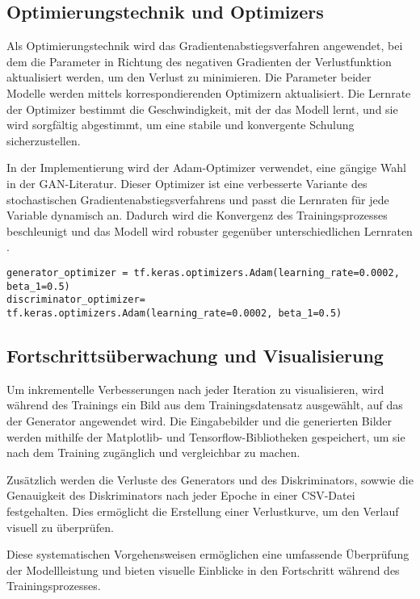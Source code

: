 \subsection{Optimierungstechnik und Optimizers}
Als Optimierungstechnik wird das Gradientenabstiegsverfahren angewendet, bei dem die Parameter in Richtung des negativen Gradienten der Verlustfunktion aktualisiert werden, um den Verlust zu minimieren. Die Parameter beider Modelle werden mittels korrespondierenden Optimizern aktualisiert. Die Lernrate der Optimizer bestimmt die Geschwindigkeit, mit der das Modell lernt, und sie wird sorgfältig abgestimmt, um eine stabile und konvergente Schulung sicherzustellen.

In der Implementierung wird der Adam-Optimizer verwendet, eine gängige Wahl in der GAN-Literatur. Dieser Optimizer ist eine verbesserte Variante des stochastischen Gradientenabstiegsverfahrens und passt die Lernraten für jede Variable dynamisch an. Dadurch wird die Konvergenz des Trainingsprozesses beschleunigt und das Modell wird robuster gegenüber unterschiedlichen Lernraten \cite{Kingma.2014}.

\begin{lstlisting}[language=pyhaff, caption={Initialisierung der Adam-Optimizers aus Pix2Pix Implementierung}, label={cod:optimizer}]
generator_optimizer = tf.keras.optimizers.Adam(learning_rate=0.0002, beta_1=0.5)
discriminator_optimizer= tf.keras.optimizers.Adam(learning_rate=0.0002, beta_1=0.5)
\end{lstlisting}

\subsection{Fortschrittsüberwachung und Visualisierung}
Um inkrementelle Verbesserungen nach jeder Iteration zu visualisieren, wird während des Trainings ein Bild aus dem Trainingsdatensatz ausgewählt, auf das der Generator angewendet wird. Die Eingabebilder und die generierten Bilder werden mithilfe der Matplotlib- und Tensorflow-Bibliotheken gespeichert, um sie nach dem Training zugänglich und vergleichbar zu machen. 

Zusätzlich werden die Verluste des Generators und des Diskriminators, sowwie die Genauigkeit des Diskriminators nach jeder Epoche in einer CSV-Datei festgehalten. Dies ermöglicht die Erstellung einer Verlustkurve, um den Verlauf visuell zu überprüfen.

Diese systematischen Vorgehensweisen ermöglichen eine umfassende Überprüfung der Modellleistung und bieten visuelle Einblicke in den Fortschritt während des Trainingsprozesses.